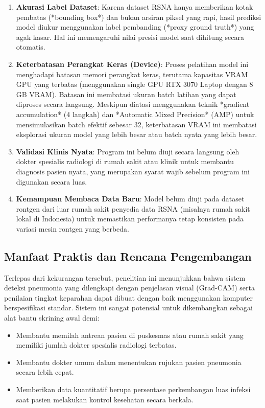 \documentclass[12pt,a4paper,oneside]{book}
\begin{document}
\begin{enumerate}
  \item \textbf{Akurasi Label Dataset}: Karena dataset RSNA hanya memberikan kotak pembatas (*bounding box*) dan bukan arsiran piksel yang rapi, hasil prediksi model diukur menggunakan label pembanding (*proxy ground truth*) yang agak kasar. Hal ini memengaruhi nilai presisi model saat dihitung secara otomatis.
  \item \textbf{Keterbatasan Perangkat Keras (Device)}: Proses pelatihan model ini menghadapi batasan memori perangkat keras, terutama kapasitas VRAM GPU yang terbatas (menggunakan single GPU RTX 3070 Laptop dengan 8 GB VRAM). Batasan ini membatasi ukuran batch latihan yang dapat diproses secara langsung. Meskipun diatasi menggunakan teknik *gradient accumulation* (4 langkah) dan *Automatic Mixed Precision* (AMP) untuk mensimulasikan batch efektif sebesar 32, keterbatasan VRAM ini membatasi eksplorasi ukuran model yang lebih besar atau batch nyata yang lebih besar.
  \item \textbf{Validasi Klinis Nyata}: Program ini belum diuji secara langsung oleh dokter spesialis radiologi di rumah sakit atau klinik untuk membantu diagnosis pasien nyata, yang merupakan syarat wajib sebelum program ini digunakan secara luas.
  \item \textbf{Kemampuan Membaca Data Baru}: Model belum diuji pada dataset rontgen dari luar rumah sakit penyedia data RSNA (misalnya rumah sakit lokal di Indonesia) untuk memastikan performanya tetap konsisten pada variasi mesin rontgen yang berbeda.
\end{enumerate}

\subsection{Manfaat Praktis dan Rencana Pengembangan}

Terlepas dari kekurangan tersebut, penelitian ini menunjukkan bahwa sistem deteksi pneumonia yang dilengkapi dengan penjelasan visual (Grad-CAM) serta penilaian tingkat keparahan dapat dibuat dengan baik menggunakan komputer berspesifikasi standar. Sistem ini sangat potensial untuk dikembangkan sebagai alat bantu skrining awal demi:

\begin{itemize}
  \item Membantu memilah antrean pasien di puskesmas atau rumah sakit yang memiliki jumlah dokter spesialis radiologi terbatas.
  \item Membantu dokter umum dalam menentukan rujukan pasien pneumonia secara lebih cepat.
  \item Memberikan data kuantitatif berupa persentase perkembangan luas infeksi saat pasien melakukan kontrol kesehatan secara berkala.
\end{itemize}

\printbibliography[heading=subbibliography,title={Daftar Referensi Bab 4}]
\end{document}
